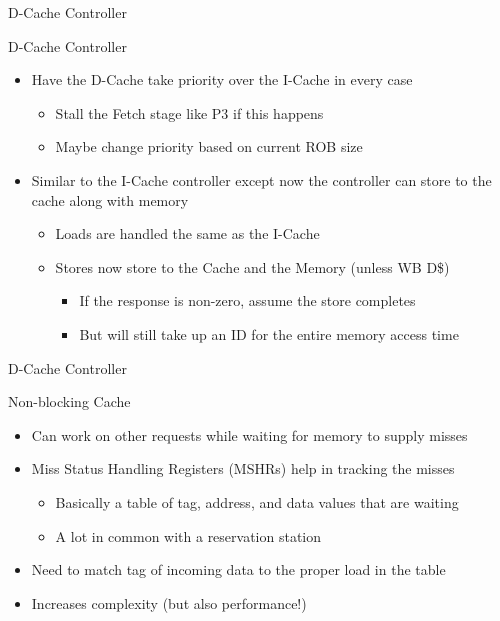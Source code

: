 \documentclass[table,dvipsnames]{beamer}
\begin{document}
\begin{frame}[fragile]{D-Cache Controller}
	\begin{block}{D-Cache Controller}
	\begin{itemize}
		\item Have the D-Cache take priority over the I-Cache in every case
		\begin{itemize}
			\item Stall the Fetch stage like P3 if this happens
			\item Maybe change priority based on current ROB size
		\end{itemize}
		\item Similar to the I-Cache controller except now the controller can store to the cache along with memory
		\begin{itemize}
			\item Loads are handled the same as the I-Cache
			\item Stores now store to the Cache and the Memory (unless WB D\$)
			\begin{itemize}	 \item If the response is non-zero, assume the store completes
			\item But will still take up an ID for the entire memory access time \end{itemize}
			\end{itemize}
	\end{itemize}

	\end{block}	
\end{frame}

\begin{frame}[fragile]{D-Cache Controller}
	\begin{block}{Non-blocking Cache}
	\begin{itemize}
		\item Can work on other requests while waiting for memory to supply misses
		\item Miss Status Handling Registers (MSHRs) help in tracking the misses
		\begin{itemize} \item Basically a table of tag, address, and data values that are waiting
		\item A lot in common with a reservation station \end{itemize}
		\item Need to match tag of incoming data to the proper load in the table
		\item Increases complexity (but also performance!)
	\end{itemize}

	\end{block}	
\end{frame}
\end{document}
